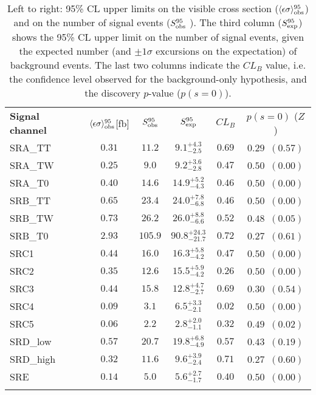 
\begin{table}
\centering
\setlength{\tabcolsep}{0.0pc}
\begin{tabular*}{\textwidth}{@{\extracolsep{\fill}}lccccc}
\noalign{\smallskip}\hline\noalign{\smallskip}
{\bf Signal channel}                        & $\langle\epsilon{\rm \sigma}\rangle_{\rm obs}^{95}$[fb]  &  $S_{\rm obs}^{95}$  & $S_{\rm exp}^{95}$ & $CL_{B}$ & $p(s=0)$ ($Z$)  \\
\noalign{\smallskip}\hline\noalign{\smallskip}
SRA\_TT    & $0.31$ &  $11.2$ & $ { 9.1 }^{ +4.3 }_{ -2.5 }$ & $0.69$  & $ 0.29$~$(0.57)$ \\%
SRA\_TW    & $0.25$ &  $9.0$ & $ { 9.2 }^{ +3.6 }_{ -2.8 }$ & $0.47$
 & $ 0.50$~$(0.00)$ \\%
SRA\_T0    & $0.40$ &  $14.6$ & $ { 14.9 }^{ +5.2 }_{ -4.3 }$ &
 $0.46$ & $ 0.50$~$(0.00)$ \\%
SRB\_TT    & $0.65$ &  $23.4$ & $ { 24.0 }^{ +7.8 }_{ -6.8 }$ &
 $0.46$ & $ 0.50$~$(0.00)$ \\%
SRB\_TW    & $0.73$ &  $26.2$ & $ { 26.0 }^{ +8.8 }_{ -6.6 }$ &
 $0.52$ & $ 0.48$~$(0.05)$ \\%
SRB\_T0    & $2.93$ &  $105.9$ & $ { 90.8 }^{ +24.3 }_{ -21.7 }$ &
$0.72$ & $ 0.27$~$(0.61)$ \\%
SRC1    & $0.44$ &  $16.0$ & $ { 16.3 }^{ +5.8 }_{ -4.2 }$ & $0.47$ &
 $ 0.50$~$(0.00)$ \\%
SRC2    & $0.35$ &  $12.6$ & $ { 15.5 }^{ +5.9 }_{ -4.2 }$ & $0.26$ &
$ 0.50$~$(0.00)$ \\%
SRC3    & $0.44$ &  $15.8$ & $ { 12.8 }^{ +4.7 }_{ -2.7 }$ & $0.69$ &
$ 0.30$~$(0.54)$ \\%
SRC4    & $0.09$ &  $3.1$ & $ { 6.5 }^{ +3.3 }_{ -2.1 }$ & $0.02$ & $
0.50$~$(0.00)$ \\%
SRC5    & $0.06$ &  $2.2$ & $ { 2.8 }^{ +2.0 }_{ -1.1 }$ & $0.32$ & $
0.49$~$(0.02)$ \\%
SRD\_low    & $0.57$ &  $20.7$ & $ {
  19.8 }^{ +6.8 }_{ -4.9 }$ & $0.57$ & $ 0.43$~$(0.19)$ \\%
SRD\_high    & $0.32$ &  $11.6$ & $ {
  9.6 }^{ +3.9 }_{ -2.4 }$ & $0.71$ & $ 0.27$~$(0.60)$ \\%
SRE    & $0.14$ &  $5.0$ & $ { 5.6 }^{ +2.7 }_{ -1.7 }$ & $0.40$ & $
0.50$~$(0.00)$ \\%

\noalign{\smallskip}\hline\noalign{\smallskip}
\end{tabular*}
\caption[Breakdown of upper limits.]{
Left to right: 95\% CL upper limits on the visible cross section
($\langle\epsilon\sigma\rangle_{\rm obs}^{95}$) and on the number of
signal events ($S_{\rm obs}^{95}$ ).  The third column
($S_{\rm exp}^{95}$) shows the 95\% CL upper limit on the number of
signal events, given the expected number (and $\pm 1\sigma$
excursions on the expectation) of background events.
The last two columns
indicate the $CL_B$ value, i.e. the confidence level observed for
the background-only hypothesis, and the discovery $p$-value ($p(s = 0)$). 
\label{table.results.exclxsec.pval.upperlimit}}
\end{table}
%
